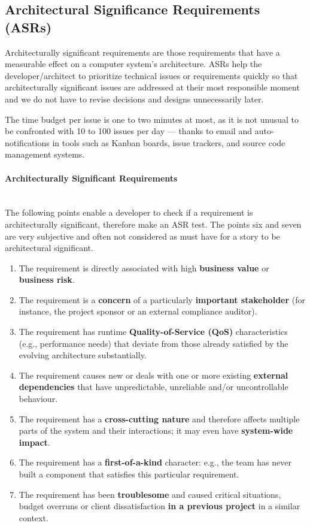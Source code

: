 \subsection{Architectural Significance Requirements (ASRs)}
Architecturally significant requirements are those requirements that have a measurable effect on a computer system’s architecture. ASRs help the developer/architect to prioritize technical issues or requirements quickly so that architecturally significant issues are addressed at their most responsible moment and we do not have to revise decisions and designs unnecessarily later.

The time budget per issue is one to two minutes at most, as it is not unusual to be confronted with 10 to 100 issues per day — thanks to email and auto-notifications in tools such as Kanban boards, issue trackers, and source code management systems.

\paragraph{Architecturally Significant Requirements} \hfill \\
The following points enable a developer to check if a requirement is architecturally significant, therefore make an ASR test. The points six and seven are very subjective and often not considered as must have for a story to be architectural significant.

\begin{enumerate}
	\item The requirement is directly associated with high \textbf{business value} or \textbf{business risk}. 
	\item The requirement is a \textbf{concern} of a particularly \textbf{important stakeholder} (for instance, the project sponsor or an external compliance auditor). 
	\item The requirement has runtime \textbf{Quality-of-Service (QoS)} characteristics (e.g., performance needs) that deviate from those already satisfied by the evolving architecture substantially. 
	\item The requirement causes new or deals with one or more existing \textbf{external dependencies} that have unpredictable, unreliable and/or uncontrollable behaviour.
	\item The requirement has a \textbf{cross-cutting nature} and therefore affects multiple parts of the system and their interactions; it may even have \textbf{system-wide impact}.  
	\item The requirement has a \textbf{first-of-a-kind} character: e.g., the team has never built a component that satisfies this particular requirement.
	\item The requirement has been \textbf{troublesome} and caused critical situations, budget overruns or client dissatisfaction \textbf{in a previous project} in a similar context.
\end{enumerate}

